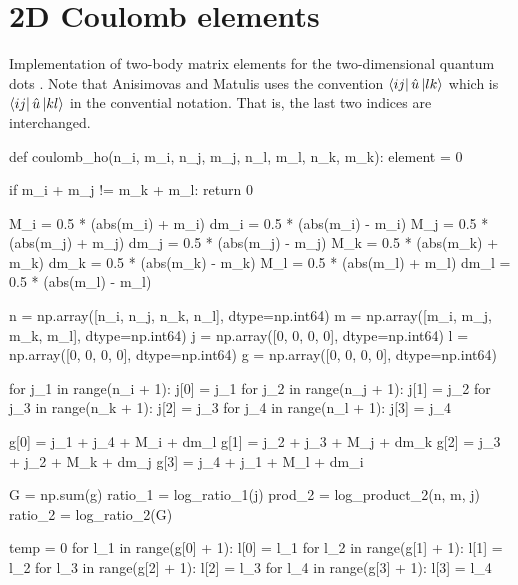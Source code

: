 \section{2D Coulomb elements}
\label{app:anisimovas}

Implementation of two-body matrix elements for the two-dimensional
quantum dots \cite{anisimovas1998energy}. Note that Anisimovas and Matulis uses
the convention 
$\bra{ij} \hat{u} \ket{lk}$ which is 
$\bra{ij} \hat{u} \ket{kl}$ in the convential notation.
That is, the last two indices are interchanged.

\begin{python}
def coulomb_ho(n_i, m_i, n_j, m_j, n_l, m_l, n_k, m_k):
    element = 0

    if m_i + m_j != m_k + m_l:
        return 0

    M_i = 0.5 * (abs(m_i) + m_i)
    dm_i = 0.5 * (abs(m_i) - m_i)
    M_j = 0.5 * (abs(m_j) + m_j)
    dm_j = 0.5 * (abs(m_j) - m_j)
    M_k = 0.5 * (abs(m_k) + m_k)
    dm_k = 0.5 * (abs(m_k) - m_k)
    M_l = 0.5 * (abs(m_l) + m_l)
    dm_l = 0.5 * (abs(m_l) - m_l)

    n = np.array([n_i, n_j, n_k, n_l], dtype=np.int64)
    m = np.array([m_i, m_j, m_k, m_l], dtype=np.int64)
    j = np.array([0, 0, 0, 0], dtype=np.int64)
    l = np.array([0, 0, 0, 0], dtype=np.int64)
    g = np.array([0, 0, 0, 0], dtype=np.int64)

    for j_1 in range(n_i + 1):
        j[0] = j_1
        for j_2 in range(n_j + 1):
            j[1] = j_2
            for j_3 in range(n_k + 1):
                j[2] = j_3
                for j_4 in range(n_l + 1):
                    j[3] = j_4

                    g[0] = j_1 + j_4 + M_i + dm_l
                    g[1] = j_2 + j_3 + M_j + dm_k
                    g[2] = j_3 + j_2 + M_k + dm_j
                    g[3] = j_4 + j_1 + M_l + dm_i

                    G = np.sum(g)
                    ratio_1 = log_ratio_1(j)
                    prod_2 = log_product_2(n, m, j)
                    ratio_2 = log_ratio_2(G)

                    temp = 0
                    for l_1 in range(g[0] + 1):
                        l[0] = l_1
                        for l_2 in range(g[1] + 1):
                            l[1] = l_2
                            for l_3 in range(g[2] + 1):
                                l[2] = l_3
                                for l_4 in range(g[3] + 1):
                                    l[3] = l_4


\end{python}
